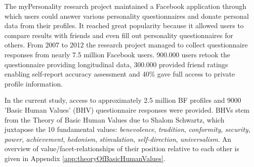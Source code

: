The myPersonality research project maintained a Facebook application through which users could answer various personality questionnaires and donate personal data from their profiles. It reached great popularity because it allowed users to compare results with friends and even fill out personality questionnaires for others. From 2007 to 2012 the research project managed to collect questionnaire responses from nearly 7.5 million Facebook users. 900.000 users retook the questionnaire providing longitudinal data, 300.000 provided friend ratings enabling self-report accuracy assessment and 40\% gave full access to private profile information.

In the current study, access to approximately 2.5 million BF profiles and 9000 'Basic Human Values' (BHV) questionnaire responses were provided. BHVs stem from the Theory of Basic Human Values due to Shalom Schwartz, which juxtapose the 10 fundamental values: \textit{benevolence}, \textit{tradition}, \textit{conformity}, \textit{security}, \textit{power}, \textit{achievement}, \textit{hedonism}, \textit{stimulation}, \textit{self-direction}, \textit{universalism}. An overview of value/facet-relationships of their position relative to each other is given in Appendix \ref{app:theoryOfBasicHumanValues}.